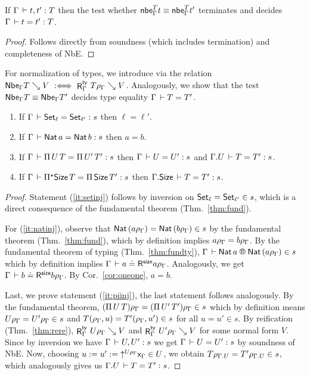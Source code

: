 \documentclass[acmlarge,review,anonymous]{acmart}\settopmatter{printfolios=true}
\begin{document}
\begin{corollary}
  If\/ $\Gamma \der t,t' : T$ then the test whether $\nbe\Gamma T t \equiv \nbe\Gamma T{t'}$
  terminates and
  decides $\Gamma \der t = t' : T$.
\end{corollary}
\begin{proof}
  Follows directly from soundness (which includes termination) and completeness of NbE.
\end{proof}

For normalization of types, we introduce 
via the relation $\Nbe \Gamma T \evalsto V \defas \RTy \Gamma {T\rhog} V$.
Analogously, we show that the test $\Nbe \Gamma T \equiv \Nbe \Gamma T'$
decides type equality $\Gamma \der T = T'$.

\begin{corollary}
\label{cor:piinj}
\bla
\begin{enumerate}
\item \label{it:setinj}
  If $\Gamma \der \Set[\ell] = \Set[\ell'] : s$ then $\ell = \ell'$.
\item \label{it:natinj}
  If $\Gamma \der \Nat a = \Nat b : s$ then $a = b$.
\item \label{it:piinj}
  If $\Gamma \der \piT U T = \piT{U'}{T'} : s$ then
  $\Gamma \der U = U' : s$ and
  $\cext \Gamma U \der T = T' : s$.
\item \label{it:allinj}
  If $\Gamma \der \epiT \Size T = \piT{\Size}{T'} : s$ then
  $\cext \Gamma \Size \der T = T' : s$.
\end{enumerate}
\end{corollary}
\begin{proof}
\bla
Statement (\ref{it:setinj}) follows by inversion on  $\Set[\ell] = \Set[\ell'] \in s$, which is a direct consequence of the fundamental theorem (Thm.~\ref{thm:fund}).

For (\ref{it:natinj}), observe that $\Nat (a\rhog) = \Nat (b\rhog) \in s$
by the fundamental theorem (Thm.~\ref{thm:fund}), which by definition implies $a\rhog = b\rhog$. %
By the fundamental theorem of typing (Thm.~\ref{thm:fundty}), $\LRTS \Gamma {\Nat a} {\Nat (a\rhog)} s$
which by definition implies $\LRSize \Gamma a {a\rhog}$.  Analogously, we get $\LRSize \Gamma b {b\rhog}$.
By Cor.~\ref{cor:oneone}, $a = b$.


Last, we prove statement (\ref{it:piinj}), the last statement follows analogously.
By the fundamental theorem,
$(\piT U T)\rhog = (\piT{U'}{T'})\rhog \in s$ which by definition means
$U\rhog = U'\rhog \in s$ and $T(\rhog,u) = T'(\rhog,u') \in s$ for all $u = u' \in s$.
By reification (Thm.~\ref{thm:rere}),
$\RTy\Gamma {U\rhog} V$ and $\RTy\Gamma {U'\rhog} V$ for some normal form
$V$.
Since by inversion we have $\Gamma \der U,U' : s$ we get $\Gamma \der U = U' : s$ by soundness of NbE.
Now, choosing $u := u' := \up {U\rhog} \var\Gamma \in U$, we obtain
$T\rhogu = T' \rhogu \in s$, which analogously gives us $\cext\Gamma U \der T = T' : s$.
\end{proof}
\end{document}
